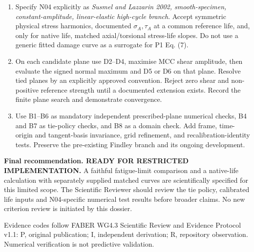 \documentclass[10pt,a4paper]{article}
\newcommand{\sct}[1]{\needspace{5\baselineskip}\vspace{7pt}{\large\bfseries\color{ink}#1}\par\vspace{2pt}}
\begin{document}
\clearpage
\sct{H  Developer handoff and decision}\label{sec:handoff}
\begin{enumerate}
\item Specify N04 explicitly as \emph{Susmel and Lazzarin 2002, smooth-specimen, constant-amplitude, linear-elastic high-cycle branch}. Accept symmetric physical stress harmonics, documented $\sigma_A,\tau_A$ at a common reference life, and, only for native life, matched axial/torsional stress-life slopes. Do not use a generic fitted damage curve as a surrogate for P1 Eq. (7).
\item On each candidate plane use D2--D4, maximise MCC shear amplitude, then evaluate the signed normal maximum and D5 or D6 on that plane. Resolve tied planes by an explicitly approved convention. Reject zero shear and non-positive reference strength until a documented extension exists. Record the finite plane search and demonstrate convergence.
\item Use B1--B6 as mandatory independent prescribed-plane numerical checks, B4 and B7 as tie-policy checks, and B8 as a domain check. Add frame, time-origin and tangent-basis invariance, grid refinement, and recalibration-identity tests. Preserve the pre-existing Findley branch and its ongoing development.
\end{enumerate}
\textbf{Final recommendation. READY FOR RESTRICTED IMPLEMENTATION.} A faithful fatigue-limit comparison and a native-life calculation with separately supplied matched curves are scientifically specified for this limited scope. The Scientific Reviewer should review the tie policy, calibrated life inputs and N04-specific numerical test results before broader claims. No new criterion review is initiated by this dossier.

\label{sec:references}
\begingroup\small\setlength{\parskip}{0pt}


\endgroup

\vfill
{\footnotesize\color{ink}Evidence codes follow FABER WG4.3 Scientific Review and Evidence Protocol v1.1: P, original publication; I, independent derivation; R, repository observation. Numerical verification is not predictive validation.}\par
\end{document}
